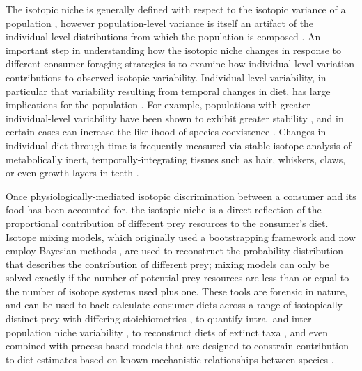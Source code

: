 \documentclass{frontiersSCNS}
\begin{document}
The isotopic niche is generally defined with respect to the isotopic variance of a population \citep{Araujo:2007iua,Araujo:2009p2286,Fink:2012eg}, however population-level variance is itself an artifact of the individual-level distributions from which the population is composed \citep{Bolnick:2007p1253,Araujo:2011gm}.
An important step in understanding how the isotopic niche changes in response to different consumer foraging strategies is to examine how individual-level variation contributions to observed isotopic variability.
Individual-level variability, in particular that variability resulting from temporal changes in diet, has large implications for the population \citep{Kondoh:2003p1625,Kondoh:2006p1622,Schreiber:2011wx}.
For example, populations with greater individual-level variability have been shown to exhibit greater stability \citep{Bolnick:2011gj}, and in certain cases can increase the likelihood of species coexistence \citep{Schreiber:2011wx}.
Changes in individual diet through time is frequently measured via stable isotope analysis of metabolically inert, temporally-integrating tissues such as hair, whiskers, claws, or even growth layers in teeth \citep{Koch:1995vj,Matthews:2004hw,Sponheimer:2006fj,Post:2008ki,Newsome:2009tn,Yeakel:2009hz,Hopkins:2015ip}.


Once physiologically-mediated isotopic discrimination between a consumer and its food has been accounted for, the isotopic niche is a direct reflection of the proportional contribution of different prey resources to the consumer's diet.
Isotope mixing models, which originally used a bootstrapping framework \citep{Phillips:2003kq,Phillips:2005p1007} and now employ Bayesian methods \citep{Moore:2008kg,Parnell:2010ub,Hopkins:2012dza,Parnell:2012wv}, are used to reconstruct the probability distribution that describes the contribution of different prey; mixing models can only be solved exactly if the number of potential prey resources are less than or equal to the number of isotope systems used plus one.
These tools are forensic in nature, and can be used to back-calculate consumer diets across a range of isotopically distinct prey with differing stoichiometries \citep{Hopkins:2015ip}, to quantify intra- and inter-population niche variability \citep{Semmens:2009uq}, to reconstruct diets of extinct taxa \citep{Yeakel:2012uc}, and even combined with process-based models that are designed to constrain contribution-to-diet estimates based on known mechanistic relationships between species \citep{Ogle:2014jg}.
\end{document}
